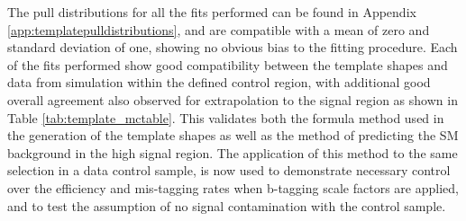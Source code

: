 The pull distributions for all the fits performed can be found in Appendix \ref{app:templatepulldistributions}, and are compatible with a mean of zero and standard deviation of one, showing no obvious bias to the fitting procedure. Each of the fits performed show good compatibility between the template shapes and data from simulation within the defined control region, with additional good overall agreement also observed for extrapolation to the signal region as shown in Table \ref{tab:template_mctable}. This validates both the formula method used in the generation of the template shapes as well as the method of predicting the \ac{SM} background in the high \nbreco signal region. The application of this method to the same selection in a data control sample, is now used to demonstrate necessary control over the efficiency and mis-tagging rates when b-tagging scale factors are applied, and to test the assumption of no signal contamination with the \mupjets control sample.

